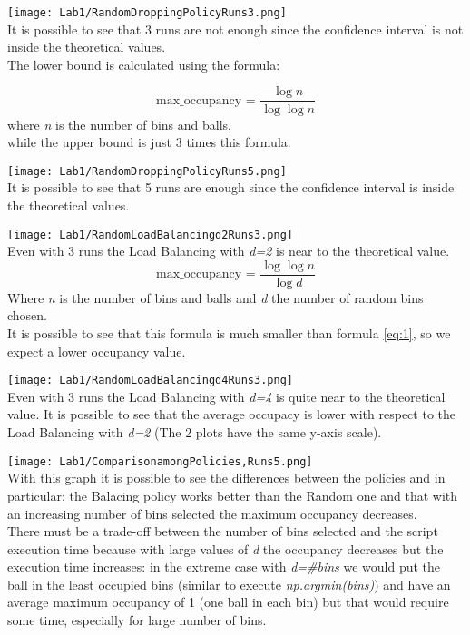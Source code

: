 \documentclass[twocolumn,letterpaper]{report}
\begin{document}
{			\noindent
			
			\texttt{[image: Lab1/RandomDroppingPolicyRuns3.png]} \\
			It is possible to see that 3 runs are not enough since the confidence interval is not inside the theoretical values. \\
			The lower bound is calculated using the formula:
			
			\begin{equation} \label{eq:1}
				 \text{max\_occupancy = }\frac{\log n}{\log \log n} 
			\end{equation}
			where \emph{n} is the number of bins and balls,\\
			while the upper bound is just 3 times this formula.
						
			\texttt{[image: Lab1/RandomDroppingPolicyRuns5.png]} \\
			It is possible to see that 5 runs are enough since the confidence interval is inside the theoretical values.
						
			\texttt{[image: Lab1/RandomLoadBalancingd2Runs3.png]} \\
			Even with 3 runs the Load Balancing with \emph{d=2} is near to the theoretical value.
			\begin{equation} \label{eq:2}
				 \text{max\_occupancy = }\frac{\log \log n}{\log d}
			\end{equation}
			Where \emph{n} is the number of bins and balls and \emph{d} the number of random bins chosen. \\
			It is possible to see that this formula is much smaller than formula \ref{eq:1}, so we expect a lower occupancy value.
			
			\texttt{[image: Lab1/RandomLoadBalancingd4Runs3.png]} \\
			Even with 3 runs the Load Balancing with \emph{d=4} is quite near to the theoretical value. 
			It is possible to see that the average occupacy is lower with respect to the Load Balancing with \emph{d=2} (The 2 plots have the same y-axis scale).
			
			\texttt{[image: Lab1/ComparisonamongPolicies,Runs5.png]} \\
			With this graph it is possible to see the differences between the policies and in particular: the Balacing policy works better than the Random one and that with an increasing number of bins selected the maximum occupancy decreases. \\ There must be a trade-off between the number of bins selected and the script execution time because with large values of \emph{d} the occupancy decreases but the execution time increases: in the extreme case with \emph{d=\#bins} we would put the ball in the least occupied bins (similar to execute \emph{np.argmin(bins)}) and have an average maximum occupancy of 1 (one ball in each bin)  but that would require some time, especially for large number of bins.
			
}
\end{document}
